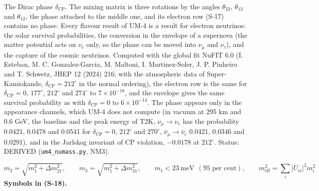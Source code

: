 \documentclass[
  10pt,
]{article}
\begin{document}
The Dirac phase \(\delta_{\mathrm{CP}}\). The mixing matrix is three
rotations by the angles \(\theta_{23}\), \(\theta_{13}\) and
\(\theta_{12}\), the phase attached to the middle one, and its electron
row (S-17) contains no phase. Every flavour result of UM-4 is a result
for electron neutrinos: the solar survival probabilities, the conversion
in the envelope of a supernova (the matter potential acts on \(\nu_e\)
only, so the phase can be moved into \(\nu_\mu\) and \(\nu_\tau\)), and
the capture of the cosmic neutrinos. Computed with the global fit NuFIT
6.0 (I. Esteban, M. C. Gonzalez-Garcia, M. Maltoni, I. Martinez-Soler,
J. P. Pinheiro and T. Schwetz, JHEP 12 (2024) 216; with the atmospheric
data of Super-Kamiokande, \(\delta_{\mathrm{CP}} = 212^\circ\) in the
normal ordering), the electron row is the same for
\(\delta_{\mathrm{CP}} = 0\), \(177^\circ\), \(212^\circ\) and
\(274^\circ\) to \(7\times10^{-18}\), and the envelope gives the same
survival probability as with \(\delta_{\mathrm{CP}} = 0\) to
\(6\times10^{-14}\). The phase appears only in the appearance channels,
which UM-4 does not compute (in vacuum at 295 km and 0.6 GeV, the
baseline and the peak energy of T2K, \(\nu_\mu \to \nu_e\) has the
probability 0.0421, 0.0478 and 0.0541 for \(\delta_{\mathrm{CP}} = 0\),
\(212^\circ\) and \(270^\circ\), \(\bar\nu_\mu \to \bar\nu_e\) 0.0421,
0.0346 and 0.0291), and in the Jarlskog invariant of CP violation,
\(-0.0178\) at \(212^\circ\). Status: DERIVED (\texttt{um4\_numass.py},
NM3).

\[
m_2 = \sqrt{m_1^2 + \Delta m^2_{21}},\qquad m_3 = \sqrt{m_1^2 + \Delta m^2_{31}},\qquad
m_1 < 23\ \text{meV}\ \ (\text{95 per cent}),\qquad
m_{\mathrm{eff}}^2 = \sum_i\lvert U_{\mathrm{e}i}\rvert^2m_i^2 \tag{S-18}
\] \textbf{Symbols in (S-18).}
\end{document}

